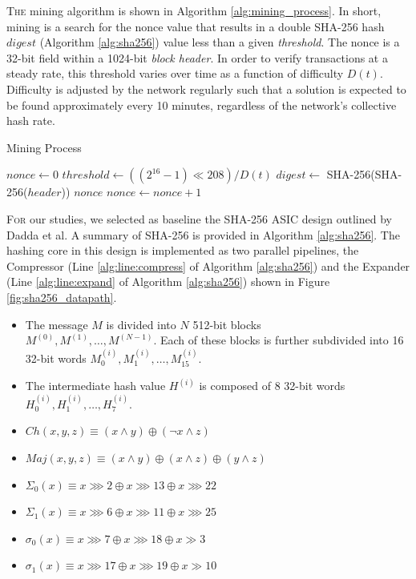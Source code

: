 \documentclass[portrait,a0,final]{a0poster}
\begin{document}
\begin{multicols}{3}
\begin{tcolorbox}
\lettrine{T}{he} mining algorithm is shown in Algorithm \ref{alg:mining_process}. In short, mining is a search for the nonce value that results in a double SHA-256 hash $digest$ (Algorithm \ref{alg:sha256}) value less than a given \emph{threshold}. The nonce is a 32-bit field within a 1024-bit \emph{block header}. In order to verify transactions at a steady rate, this threshold varies over time as a function of difficulty $D(t)$. Difficulty is adjusted by the network regularly such that a solution is expected to be found approximately every 10 minutes, regardless of the network's collective hash rate.
\end{tcolorbox}

\hfill
\begin{algorithm}[H]
\caption{Mining Process}
\label{alg:mining_process}
\begin{algorithmic}[1]
\State $nonce\gets 0$
\State $threshold \gets ((2^{16} - 1) \ll 208) / D(t)$
\State $digest \gets$ SHA-256(SHA-256($header$))
\State \Return $nonce$
\Else
\State $nonce \gets nonce + 1$
\EndIf
\EndWhile
\end{algorithmic}
\end{algorithm}

\begin{tcolorbox}[title=SHA-256 Datapath Overview]
\lettrine{F}{or} our studies, we selected as baseline the SHA-256 ASIC design outlined by Dadda et al. A summary of SHA-256 is provided in Algorithm \ref{alg:sha256}. The hashing core in this design is implemented as two parallel pipelines, the Compressor (Line \ref{alg:line:compress} of Algorithm \ref{alg:sha256}) and the Expander (Line \ref{alg:line:expand} of Algorithm \ref{alg:sha256}) shown in Figure \ref{fig:sha256_datapath}.

\label{alg:sha256}
\begin{itemize}
\item The message $M$ is divided into $N$ 512-bit blocks \\ $M^{(0)}, M^{(1)},\ldots,M^{(N-1)}$. Each of these blocks is further subdivided into 16 32-bit words $M^{(i)}_0, M^{(i)}_1,\ldots,M^{(i)}_{15}$.
\item The intermediate hash value $H^{(i)}$ is composed of 8 32-bit words $H^{(i)}_0, H^{(i)}_1,\ldots,H^{(i)}_{7}$.
\item $Ch(x,y,z) \equiv (x \land y) \oplus (\neg x \land z)$
\item $Maj(x,y,z) \equiv (x \land y) \oplus (x \land z) \oplus (y \land z)$
\item $\Sigma_0(x) \equiv x \ggg 2 \oplus x \ggg 13 \oplus x \ggg 22$
\item $\Sigma_1(x) \equiv x \ggg 6 \oplus x \ggg 11 \oplus x \ggg 25$
\item $\sigma_0(x) \equiv x \ggg 7 \oplus x \ggg 18 \oplus x \gg 3$
\item $\sigma_1(x) \equiv x \ggg 17 \oplus x \ggg 19 \oplus x \gg 10$
\end{itemize}
\end{tcolorbox}


\end{multicols}
\end{document}
